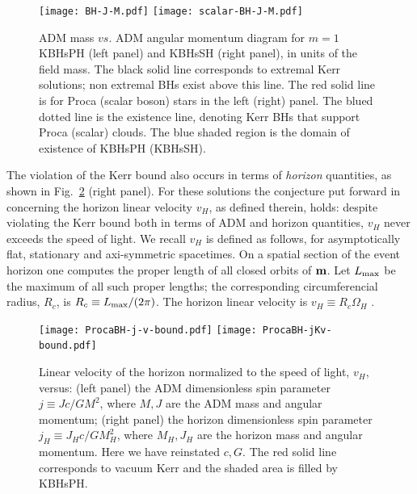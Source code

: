 %
\begin{figure}[h!]
  \begin{center}
    \texttt{[image: BH-J-M.pdf]}
      \texttt{[image: scalar-BH-J-M.pdf]}
  \end{center}
  \caption{ADM mass $vs.$ ADM angular momentum diagram for $m=1$ KBHsPH (left panel) and KBHsSH (right panel), in units of the field mass. The black solid line corresponds to extremal Kerr solutions; non extremal BHs exist above this line. The red solid line is for Proca (scalar boson) stars in the left (right) panel. The blued dotted line is the existence line, denoting Kerr BHs that support Proca (scalar) clouds. The blue shaded region is the domain of existence of KBHsPH (KBHsSH).}
  \label{fig2}
\end{figure}
 

The violation of the Kerr bound also occurs in terms of \textit{horizon} quantities, as shown in Fig.~\ref{vconjecture} (right panel). For these solutions the conjecture put forward in~\cite{Herdeiro:2015moa} concerning the horizon linear velocity $v_H$, as defined therein, holds: despite violating the Kerr bound both in terms of ADM and horizon quantities, $v_H$ never exceeds the speed of light.  We recall $v_H$ is defined as follows, for asymptotically flat, stationary and axi-symmetric spacetimes. On a spatial section of the event horizon one computes the proper length of all closed orbits of ${\bf m}$. Let $L_{\rm max}$ be the maximum of all such proper lengths; the corresponding circumferencial radius, $R_c$, is $R_c\equiv {L_{\rm max}}/({2\pi})$. 
The horizon linear velocity is $v_H \equiv R_c \Omega_H$ \cite{Herdeiro:2015moa}.
 





\begin{figure}[h!]
  \begin{center}
    \texttt{[image: ProcaBH-j-v-bound.pdf]}
      \texttt{[image: ProcaBH-jKv-bound.pdf]}
  \end{center}
 \caption{Linear velocity of the horizon normalized to the speed of light, $v_H$, versus:  (left panel)  the ADM dimensionless spin parameter $j\equiv Jc/GM^2$, where $M,J$ are the ADM mass and angular momentum; (right panel) the horizon dimensionless spin parameter $j_H\equiv J_Hc/GM_H^2$, where $M_H,J_H$ are the horizon mass and angular momentum. Here we have reinstated $c,G$. The red solid line corresponds to vacuum Kerr and the shaded area is filled by KBHsPH.}
  \label{vconjecture}
\end{figure}







